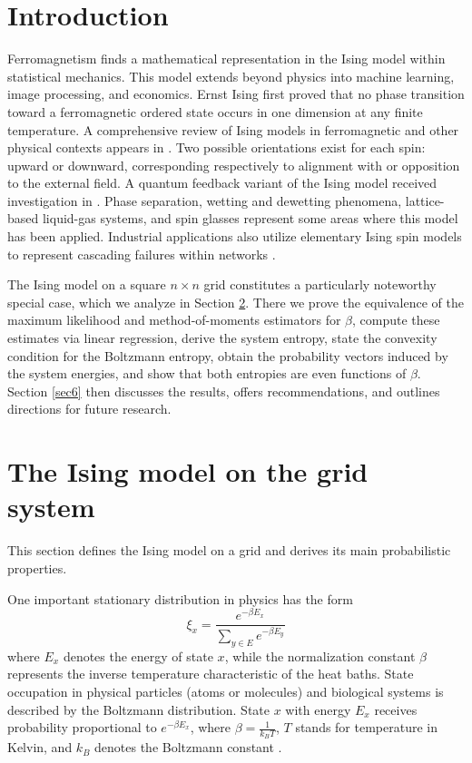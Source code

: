\documentclass[twoside]{article}
\begin{document}
\section{Introduction}
Ferromagnetism finds a mathematical representation in the Ising model within statistical mechanics. This model extends beyond physics into machine learning, image processing, and economics. Ernst Ising first proved that no phase transition toward a ferromagnetic ordered state occurs in one dimension at any finite temperature. A comprehensive review of Ising models in ferromagnetic and other physical contexts appears in \cite{30}. Two possible orientations exist for each spin: upward or downward, corresponding respectively to alignment with or opposition to the external field. A quantum feedback variant of the Ising model received investigation in \cite{24}. Phase separation, wetting and dewetting phenomena, lattice-based liquid-gas systems, and spin glasses represent some areas where this model has been applied. Industrial applications also utilize elementary Ising spin models to represent cascading failures within networks \citep{21}.  

The Ising model on a square $n \times n$ grid constitutes a particularly noteworthy special case, which we analyze in Section \ref{sec3}. There we prove the equivalence of the maximum likelihood and method-of-moments estimators for $\beta$, compute these estimates via linear regression, derive the system entropy, state the convexity condition for the Boltzmann entropy, obtain the probability vectors induced by the system energies, and show that both entropies are even functions of $\beta$. Section \ref{sec6} then discusses the results, offers recommendations, and outlines directions for future research.

\section{The Ising model on the grid system} \label{sec3}
This section defines the Ising model on a grid and derives its main probabilistic properties.

One important stationary distribution in physics has the form
\begin{equation} \label{3.3}
{{\xi }_{x}}=\frac{{{e}^{-\beta {{E}_{x}}}}}{\sum\nolimits_{y\in E}{{{e}^{-\beta {{E}_{y}}}}}}
\end{equation}
where ${{E}_{x}}$ denotes the energy of state $x$, while the normalization constant $\beta$ represents the inverse temperature characteristic of the heat baths. State occupation in physical particles (atoms or molecules) and biological systems is described by the Boltzmann distribution. State $x$ with energy ${{E}_{x}}$ receives probability proportional to ${{e}^{-\beta {{E}_{x}}}}$, where $\beta =\tfrac{1}{{{k}_{B}}T}$, $T$ stands for temperature in Kelvin, and ${{k}_{B}}$ denotes the Boltzmann constant \citep{6}.
\end{document}
